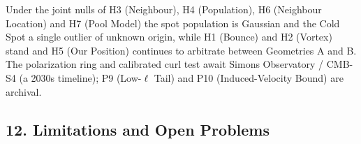 \documentclass[
]{article}
\begin{document}
Under the joint nulls of H3 (Neighbour), H4 (Population), H6 (Neighbour
Location) and H7 (Pool Model) the spot population is Gaussian and the
Cold Spot a single outlier of unknown origin, while H1 (Bounce) and H2
(Vortex) stand and H5 (Our Position) continues to arbitrate between
Geometries A and B. The polarization ring and calibrated curl test await
Simons Observatory / CMB-S4 (a 2030s timeline); P9 (Low-\(\ell\) Tail)
and P10 (Induced-Velocity Bound) are archival.

\hypertarget{limitations-and-open-problems}{%
\subsection{\texorpdfstring{\textbf{12. Limitations and Open
Problems}}{12. Limitations and Open Problems}}\label{limitations-and-open-problems}}
\end{document}
